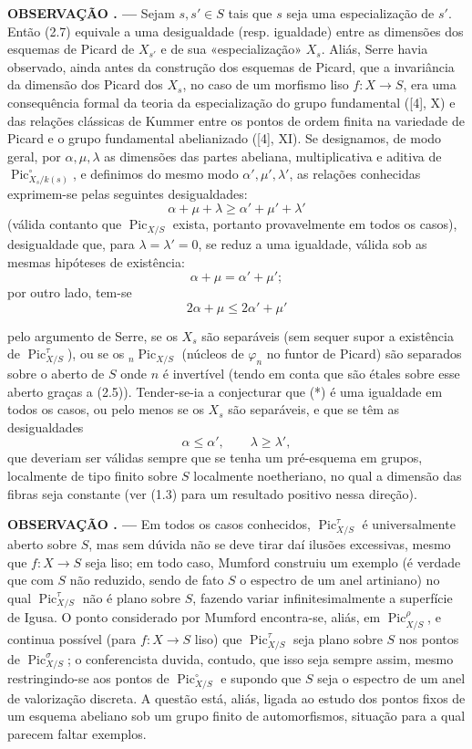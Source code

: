 \documentclass[11pt,twoside,openany]{book}
\numberwithin{equation}{section}
\newcommand{\src}[1]{%
  \phantomsection\hypertarget{src:#1}{}%
  \marginpar{\raggedleft\footnotesize\sffamily #1}%
}
\theoremstyle{plain}
\theoremstyle{definition}
\theoremstyle{remark}
\newcommand{\result}[2]{%
  \par\medskip\noindent\textbf{#1%
  \if\relax\detokenize{#2}\relax\else\space#2\fi. ---}\enspace
}
\newcommand{\FgaUnitKey}{frontmatter}
\renewcommand{\src}[1]{%
  \phantomsection\hypertarget{src:\FgaUnitKey:#1}{}%
  \marginpar{\raggedleft\footnotesize\sffamily #1}%
}
\begin{document}
\result{OBSERVAÇÃO}{2.8} Sejam $s,s'\in S$ tais que $s$ seja uma especialização
de $s'$. Então (2.7) equivale a uma desigualdade (resp. igualdade) entre as
dimensões dos esquemas de Picard de $X_{s'}$ e de sua «especialização» $X_s$.
Aliás, Serre havia observado, ainda antes da construção dos esquemas de Picard,
que a invariância da dimensão dos Picard dos $X_s$, no caso de um morfismo liso
$f:X\longrightarrow S$, era uma consequência formal da teoria da
especialização do grupo fundamental ([4], X) e das relações clássicas de Kummer
entre os pontos de ordem finita na variedade de Picard e o grupo fundamental
abelianizado ([4], XI). Se designamos, de modo geral, por $\alpha,\mu,\lambda$
as dimensões das partes abeliana, multiplicativa e aditiva de
$\operatorname{Pic}_{X_s/k(s)}^\circ$, e definimos do mesmo modo
$\alpha',\mu',\lambda'$, as relações conhecidas exprimem-se pelas seguintes
desigualdades:
\[
\tag{*}\alpha+\mu+\lambda\geq\alpha'+\mu'+\lambda'
\]
(válida contanto que $\operatorname{Pic}_{X/S}$ exista, portanto provavelmente
em todos os casos), desigualdade que, para $\lambda=\lambda'=0$, se reduz a uma
igualdade, válida sob as mesmas hipóteses de existência:
\[
\alpha+\mu=\alpha'+\mu' ;
\]
por outro lado, tem-se
\[
\tag{**}2\alpha+\mu\leq2\alpha'+\mu'
\]
\src{235}
pelo argumento de Serre, se os $X_s$ são separáveis (sem sequer supor a
existência de $\operatorname{Pic}_{X/S}^\tau$), ou se os
${}_n\operatorname{Pic}_{X/S}$ (núcleos de $\varphi_n$ no funtor de Picard) são
separados sobre o aberto de $S$ onde $n$ é invertível (tendo em conta que são étales sobre esse aberto graças a (2.5)).
Tender-se-ia a conjecturar que (*) é uma igualdade em todos os casos, ou pelo
menos se os $X_s$ são separáveis, e que se têm as desigualdades
\[
\tag{***}\alpha\leq\alpha',\qquad\lambda\geq\lambda',
\]
que deveriam ser válidas sempre que se tenha um pré-esquema em grupos,
localmente de tipo finito sobre $S$ localmente noetheriano, no qual a dimensão
das fibras seja constante (ver (1.3) para um resultado positivo nessa direção).

\result{OBSERVAÇÃO}{2.9} Em todos os casos conhecidos,
$\operatorname{Pic}_{X/S}^\tau$ é universalmente aberto sobre $S$, mas sem
dúvida não se deve tirar daí ilusões excessivas, mesmo que
$f:X\longrightarrow S$ seja liso; em todo caso, Mumford
construiu um exemplo (é verdade que com $S$ não reduzido, sendo de fato $S$ o
espectro de um anel artiniano) no qual $\operatorname{Pic}_{X/S}^\tau$ não é
plano sobre $S$, fazendo variar infinitesimalmente a superfície de Igusa. O
ponto considerado por Mumford encontra-se, aliás, em
$\operatorname{Pic}_{X/S}^\rho$, e continua possível (para
$f:X\longrightarrow S$ liso) que $\operatorname{Pic}_{X/S}^\tau$ seja plano
sobre $S$ nos pontos de $\operatorname{Pic}_{X/S}^\sigma$; o conferencista
duvida, contudo, que isso seja sempre assim, mesmo restringindo-se aos pontos de
$\operatorname{Pic}_{X/S}^\circ$ e supondo que $S$ seja o espectro de um anel
de valorização discreta. A questão está, aliás, ligada ao estudo dos pontos
fixos de um esquema abeliano sob um grupo finito de automorfismos, situação
para a qual parecem faltar exemplos.
\end{document}
